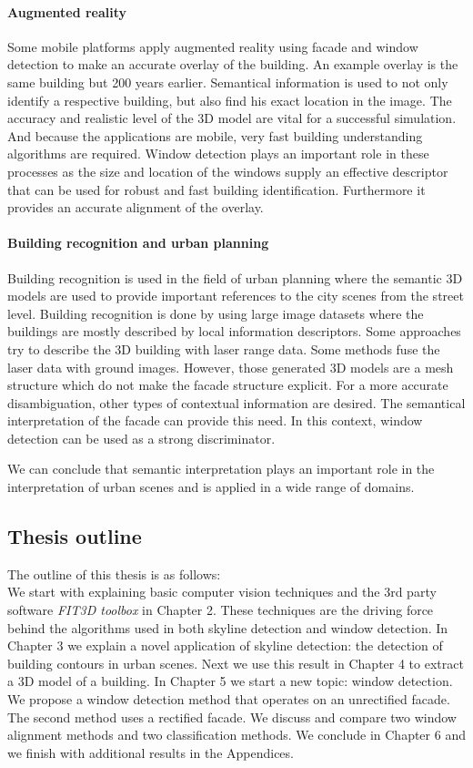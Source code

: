 \paragraph{Augmented reality}
	Some mobile platforms apply augmented reality using facade and window
	detection to make an accurate overlay of the building. An example overlay is
	the same building but 200 years earlier.  Semantical information is used to
	not only identify a respective building, but also find his exact location in
	the image.  The accuracy and realistic level of the 3D model are vital for a
	successful simulation.  And because the applications are mobile, very fast
	building understanding algorithms are required.  Window detection plays an
	important role in these processes as the size and location of the windows
	supply an effective descriptor that can be used for robust and fast building
	identification.  Furthermore it provides an accurate alignment of the
	overlay.

\paragraph{Building recognition and urban planning}
	Building recognition is used in the field of urban planning where the
	semantic 3D models are used to provide important references to the city
	scenes from the street level.  Building recognition is done by using large
	image datasets where the buildings are mostly described by local information
	descriptors.  Some approaches try to describe the 3D building with laser
	range data. Some methods fuse the laser data with ground images. However,
	those generated 3D models are a mesh structure which do not make the facade
	structure explicit.  For a more accurate disambiguation, other types of
	contextual information are desired.  The semantical interpretation of the
	facade can provide this need.  In this context, window detection can be used
	as a strong discriminator.

We can conclude that semantic interpretation plays an important role in the
interpretation of urban scenes and is applied in a wide range of domains.  

\newpage
\subsection{Thesis outline}
The outline of this thesis is as follows:\\ 

We start with explaining basic computer vision techniques and the 3rd party
software \emph{FIT3D toolbox} in Chapter 2.  These techniques are the driving
force behind the algorithms used in both skyline detection and window detection.  
In Chapter 3 we explain a novel application of skyline detection: the detection
of building contours in urban scenes. Next we use this result in Chapter 4 to
extract a 3D model of a building.
In Chapter 5 we start a new topic: window detection. We propose a window
detection method that operates on an unrectified facade. The second method uses
a rectified facade. We discuss and compare two window alignment methods and two
classification methods.  We conclude in Chapter 6 and we finish with additional
results in the Appendices.\\

